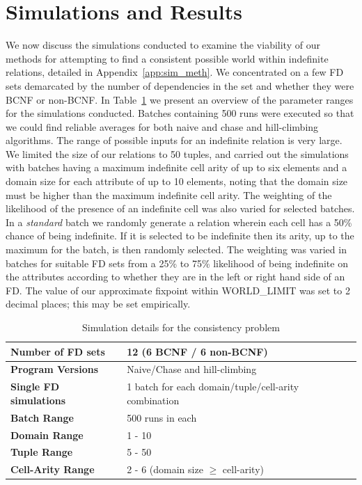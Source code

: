 \section{Simulations and Results}\label{sec:cpresults}

We now discuss the simulations conducted to examine the 
viability of our methods for attempting to find a
consistent possible world within indefinite relations, detailed in 
Appendix~\ref{app:sim_meth}.
We concentrated on a few FD sets demarcated by the number of
dependencies in the set and whether they were BCNF or non-BCNF.  
In Table~\ref{table:simpar} we present an overview of the parameter
ranges for the simulations
conducted. Batches containing 500 runs were executed so that we 
could find reliable averages for both naive and chase and
hill-climbing algorithms. The range of possible inputs for an indefinite
relation is very large. We limited the size of our relations to 50 tuples,
and carried out the simulations with batches having a maximum indefinite
cell arity of up to six elements and a domain size for each attribute of
up to 10 elements, noting that the domain size must be higher than the
maximum indefinite cell arity.  The weighting of the likelihood of the
presence of an indefinite cell was also varied for selected batches.
In a {\em standard} batch we randomly generate a relation wherein each
cell has a 50\% chance of being indefinite. If it is selected to be
indefinite then its arity, up to the maximum for the batch, is then
randomly selected. The weighting was varied in batches for suitable
FD sets from a 25\% to 75\% likelihood of being indefinite on the
attributes according to whether they are in the left or right hand side
of an FD. The value of our approximate fixpoint within WORLD\_LIMIT
was set to 2 decimal places; this may be set empirically.

{\line
\begin{table}[ht]
\begin{center}
\begin{tabular}{|l||l|}
\hline
{\bf Number of FD sets}  & 12 (6 BCNF / 6 non-BCNF) \\ \hline
{\bf Program Versions} & Naive/Chase and hill-climbing \\ \hline
{\bf Single FD simulations} & 1 batch for each domain/tuple/cell-arity combination\\ \hline
{\bf Batch Range} & 500 runs in each \\ \hline
{\bf Domain Range} & 1 - 10  \\ \hline
{\bf Tuple Range} & 5 - 50  \\ \hline 
{\bf Cell-Arity Range} & 2 - 6 (domain size $\ge$ cell-arity) \\ \hline 
\end{tabular}
\end{center}
\caption{\label{table:simpar} Simulation details for the consistency problem}
\end{table}
}



